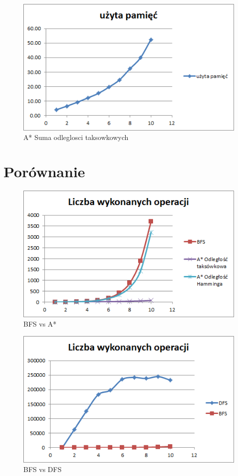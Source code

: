 \documentclass{classrep}
\begin{document}
\begin{figure}[ht]
\centering
			\includegraphics[scale=0.65]{pictures/A3_space.png}
	\caption{A* Suma odleglosci taksowkowych}
	\label{fig:A* Suma odleglosci taksowkowych}
\end{figure}

\cleardoublepage	
\section{Porównanie}

\begin{figure}[ht]
\centering
			\includegraphics[scale=0.65]{pictures/operacje_BFS_vs_A.png}
	\caption{BFS vs A*}
	\label{fig:BFS vs A*}
\end{figure}

\begin{figure}[ht]
\centering
			\includegraphics[scale=0.65]{pictures/operacje_BFS_vs_DFS.png}
	\caption{BFS vs DFS}
	\label{fig:BFS vs DFS}
\end{figure}
\end{document}
